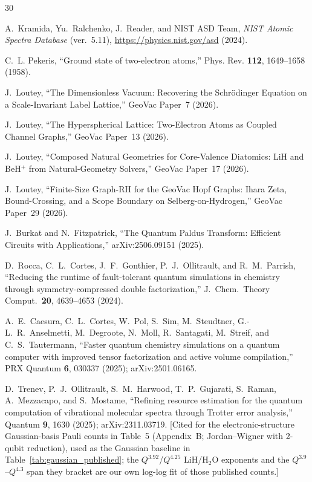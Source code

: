 \documentclass[aps,pra,twocolumn,superscriptaddress,longbibliography]{revtex4-2}
\begin{document}
\begin{thebibliography}{30}

A.~Kramida, Yu.~Ralchenko, J.~Reader, and NIST ASD Team,
\textit{NIST Atomic Spectra Database} (ver.~5.11),
\url{https://physics.nist.gov/asd} (2024).

C.~L. Pekeris,
``Ground state of two-electron atoms,''
Phys. Rev. \textbf{112}, 1649--1658 (1958).


J.~Loutey,
``The Dimensionless Vacuum: Recovering the Schr\"odinger Equation on a Scale-Invariant Label Lattice,''
GeoVac Paper~7 (2026).

J.~Loutey,
``The Hyperspherical Lattice: Two-Electron Atoms as Coupled Channel Graphs,''
GeoVac Paper~13 (2026).

J.~Loutey,
``Composed Natural Geometries for Core-Valence Diatomics: LiH and BeH$^+$ from Natural-Geometry Solvers,''
GeoVac Paper~17 (2026).

J.~Loutey,
``Finite-Size Graph-RH for the GeoVac Hopf Graphs: Ihara Zeta, Bound-Crossing, and a Scope Boundary on Selberg-on-Hydrogen,''
GeoVac Paper~29 (2026).

J.~Burkat and N.~Fitzpatrick,
``The Quantum Paldus Transform: Efficient Circuits with Applications,''
arXiv:2506.09151 (2025).

D.~Rocca, C.~L.~Cortes, J.~F.~Gonthier, P.~J.~Ollitrault, and R.~M.~Parrish,
``Reducing the runtime of fault-tolerant quantum simulations in chemistry
through symmetry-compressed double factorization,''
J.\ Chem.\ Theory Comput.\ \textbf{20}, 4639--4653 (2024).

A.~E.~Caesura, C.~L.~Cortes, W.~Pol, S.~Sim, M.~Steudtner,
G.-L.~R.~Anselmetti, M.~Degroote, N.~Moll, R.~Santagati, M.~Streif,
and C.~S.~Tautermann,
``Faster quantum chemistry simulations on a quantum computer with
improved tensor factorization and active volume compilation,''
PRX Quantum \textbf{6}, 030337 (2025); arXiv:2501.06165.

D.~Trenev, P.~J.~Ollitrault, S.~M.~Harwood, T.~P.~Gujarati,
S.~Raman, A.~Mezzacapo, and S.~Mostame,
``Refining resource estimation for the quantum computation of
vibrational molecular spectra through Trotter error analysis,''
Quantum \textbf{9}, 1630 (2025); arXiv:2311.03719.
[Cited for the electronic-structure Gaussian-basis Pauli counts in
Table~5 (Appendix~B; Jordan--Wigner with 2-qubit reduction), used as
the Gaussian baseline in Table~\ref{tab:gaussian_published}; the
$Q^{3.92}$/$Q^{4.25}$ LiH/H$_2$O exponents and the
$Q^{3.9}$--$Q^{4.3}$ span they bracket are our own log-log fit of
those published counts.]


\end{thebibliography}
\end{document}
